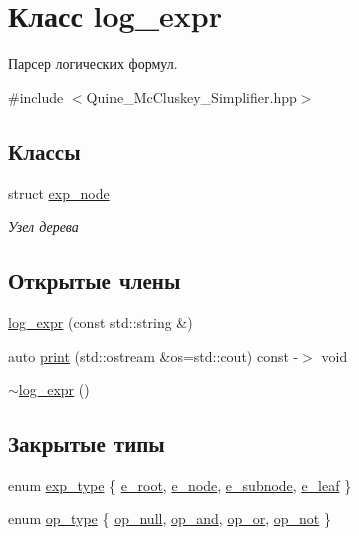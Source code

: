 \hypertarget{classlog__expr}{}\section{Класс log\+\_\+expr}
\label{classlog__expr}


Парсер логических формул.  




{\ttfamily \#include $<$Quine\+\_\+\+Mc\+Cluskey\+\_\+\+Simplifier.\+hpp$>$}

\subsection*{Классы}
\begin{DoxyCompactItemize}
\item 
struct \hyperlink{structlog__expr_1_1exp__node}{exp\+\_\+node}
\begin{DoxyCompactList}\small\item\em Узел дерева \end{DoxyCompactList}\end{DoxyCompactItemize}
\subsection*{Открытые члены}
\begin{DoxyCompactItemize}
\item 
\hyperlink{classlog__expr_a3227eb98488a3c821152208b233e53f0}{log\+\_\+expr} (const std\+::string \&)
\item 
auto \hyperlink{classlog__expr_ad05d17c0af134cc5d026e909ca73bc7a}{print} (std\+::ostream \&os=std\+::cout) const -\/$>$ void
\item 
\hyperlink{classlog__expr_a311a852d7b7dbca17d1f2f612445fa01}{$\sim$log\+\_\+expr} ()
\end{DoxyCompactItemize}
\subsection*{Закрытые типы}
\begin{DoxyCompactItemize}
\item 
enum \hyperlink{classlog__expr_abfd63d60441373c4017ef250008102d9}{exp\+\_\+type} \{ \hyperlink{classlog__expr_abfd63d60441373c4017ef250008102d9a96bb6b9912d801ae7756d49364d0c92e}{e\+\_\+root}, 
\hyperlink{classlog__expr_abfd63d60441373c4017ef250008102d9a767d2708549a716860b55a7895abc3a7}{e\+\_\+node}, 
\hyperlink{classlog__expr_abfd63d60441373c4017ef250008102d9ad402859556c53152f1d12f057e53ce1d}{e\+\_\+subnode}, 
\hyperlink{classlog__expr_abfd63d60441373c4017ef250008102d9aa573107af28c7da49bfe39a00efbe71e}{e\+\_\+leaf}
 \}
\item 
enum \hyperlink{classlog__expr_acef7af5805dc4da8b53854ae7e458351}{op\+\_\+type} \{ \hyperlink{classlog__expr_acef7af5805dc4da8b53854ae7e458351a3a0a1f5c5bab8a1cb145b489e2111545}{op\+\_\+null}, 
\hyperlink{classlog__expr_acef7af5805dc4da8b53854ae7e458351a9e4c9629f55a38eb1135f206cf3aa6ed}{op\+\_\+and}, 
\hyperlink{classlog__expr_acef7af5805dc4da8b53854ae7e458351a89738cbd930b0bdc5b8a45376dc2da46}{op\+\_\+or}, 
\hyperlink{classlog__expr_acef7af5805dc4da8b53854ae7e458351aa568d5cf7175023125fbf7ed7b4ad92b}{op\+\_\+not}
 \}
\end{DoxyCompactItemize}
